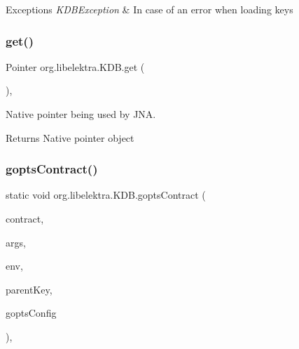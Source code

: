 \begin{DoxyExceptions}{Exceptions}
{\em K\+D\+B\+Exception} & In case of an error when loading keys \\
\hline
\end{DoxyExceptions}
\mbox{\label{classorg_1_1libelektra_1_1KDB_a600abc786bde91a3122bd96be991a3d5}} 
\subsubsection{\texorpdfstring{get()}{get()}\hspace{0.1cm}{\footnotesize\ttfamily [2/2]}}
{\footnotesize\ttfamily Pointer org.\+libelektra.\+K\+D\+B.\+get (\begin{DoxyParamCaption}{ }\end{DoxyParamCaption})\hspace{0.3cm}{\ttfamily [inline]}, {\ttfamily [protected]}}



Native pointer being used by J\+NA. 

\begin{DoxyReturn}{Returns}
Native pointer object 
\end{DoxyReturn}
\mbox{\label{classorg_1_1libelektra_1_1KDB_a4f1e5668d266af1e5baa440125fa5eb4}} 
\subsubsection{\texorpdfstring{gopts\+Contract()}{goptsContract()}}
{\footnotesize\ttfamily static void org.\+libelektra.\+K\+D\+B.\+gopts\+Contract (\begin{DoxyParamCaption}\item[{final \hyperlink{classorg_1_1libelektra_1_1KeySet}{Key\+Set}}]{contract,  }\item[{final String \mbox{[}$\,$\mbox{]}}]{args,  }\item[{final String \mbox{[}$\,$\mbox{]}}]{env,  }\item[{final \hyperlink{classorg_1_1libelektra_1_1Key}{Key}}]{parent\+Key,  }\item[{final \hyperlink{classorg_1_1libelektra_1_1KeySet}{Key\+Set}}]{gopts\+Config }\end{DoxyParamCaption})\hspace{0.3cm}{\ttfamily [inline]}, {\ttfamily [static]}}



